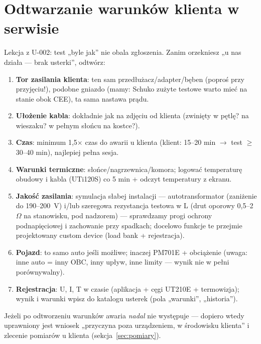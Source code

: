 \documentclass[11pt]{article}
\newcommand{\key}[1]{\textbf{\color{navy}#1}}
\begin{document}
\section{Odtwarzanie warunków klienta w serwisie}\label{sec:odtwarzanie}
Lekcja z U-002: test „byle jak'' nie obala zgłoszenia. Zanim orzekniesz „u nas działa — brak usterki'', odtwórz:
\begin{enumerate}
\item \key{Tor zasilania klienta}: ten sam przedłużacz/adapter/bęben (poproś przy przyjęciu!), podobne gniazdo (mamy: Schuko zużyte testowe warto mieć na stanie obok CEE), ta sama nastawa prądu.
\item \key{Ułożenie kabla}: dokładnie jak na zdjęciu od klienta (zwinięty w pętlę? na wieszaku? w pełnym słońcu na kostce?).
\item \key{Czas}: minimum 1,5$\times$ czas do awarii u klienta (klient: 15--20 min $\rightarrow$ test $\geq$30--40 min), najlepiej pełna sesja.
\item \key{Warunki termiczne}: słońce/nagrzewnica/komora; logować temperaturę obudowy i kabla (UTi120S) co 5 min + odczyt temperatury z ekranu.
\item \key{Jakość zasilania}: symulacja słabej instalacji — autotransformator (zaniżenie do 190--200~V) i/lub szeregowa rezystancja testowa w L (drut oporowy 0,5--2~$\Omega$ na stanowisku, pod nadzorem) — sprawdzamy progi ochrony podnapięciowej i zachowanie przy spadkach; docelowo funkcje te przejmie projektowany custom device (load bank + rejestracja).
\item \key{Pojazd}: to samo auto jeśli możliwe; inaczej PM701E + obciążenie (uwaga: inne auto = inny OBC, inny upływ, inne limity — wynik nie w pełni porównywalny).
\item \key{Rejestracja}: U, I, T w czasie (aplikacja + cęgi UT210E + termowizja); wynik i warunki wpisz do katalogu usterek (pola „warunki'', „historia'').
\end{enumerate}
Jeżeli po odtworzeniu warunków awaria \emph{nadal} nie występuje — dopiero wtedy uprawniony jest wniosek „przyczyna poza urządzeniem, w środowisku klienta'' i zlecenie pomiarów u klienta (sekcja~\ref{sec:pomiary}).
\end{document}
